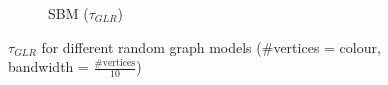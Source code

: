 \begin{figure}
    \hfill%
    \begin{subfigure}{0.3\columnwidth}
    \caption{SBM ($\tau_{GLR}$)}%
    \label{tau_GLR_SBM}%
    \end{subfigure}%
    \hfill
    \caption{$\tau_{GLR}$  for different random graph models (\#vertices = colour, bandwidth = $\frac{\text{\# vertices}}{10}$)}
\label{GLR_Threshold_plots}
\end{figure}


